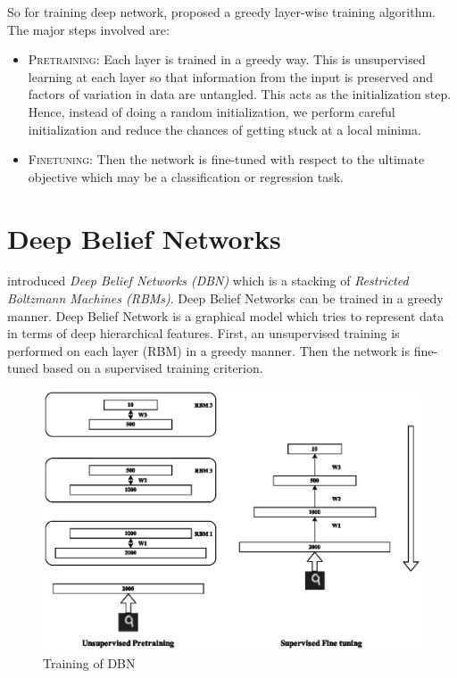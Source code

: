So for training deep network, \citet{hinton2006reducing} proposed a greedy layer-wise training algorithm.  The major steps involved are:
\begin{itemize}
\item \textsc{Pretraining}: Each layer is trained in a greedy way.  This is unsupervised learning at each layer so that information from the input is preserved and factors of variation in data are untangled.  This acts as the initialization step.  Hence, instead of doing a random initialization, we perform careful initialization and reduce the chances of getting stuck at a local minima.
\item \textsc{Finetuning}: Then the network is fine-tuned with respect to the ultimate objective which may be a classification or regression task.
\end{itemize}

\section{Deep Belief Networks}
\citet{hinton2006reducing} introduced \emph{Deep Belief Networks (DBN)} which is a stacking of \emph{Restricted Boltzmann Machines (RBMs)}.  Deep Belief Networks can be trained in a greedy manner\cite{hinton2006reducing}.  Deep Belief Network is a graphical model which tries to represent data in terms of deep hierarchical features.  First, an unsupervised training is performed on each layer (RBM) in a greedy manner.  Then the network is fine-tuned based on a supervised training criterion.\\
\begin{figure}[!ht]
\centering
\includegraphics[width=1\textwidth]{./imgs/RBM_Train.eps} 
\caption{Training of DBN}
\end{figure}

